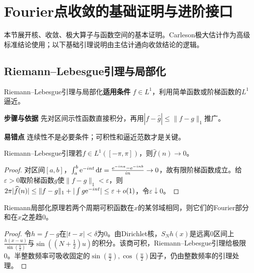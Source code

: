\section{Fourier点收敛的基础证明与进阶接口}\label{deep:fourier_source_deep}

\begin{examtip}本节展开核、收敛、极大算子与函数空间的基本证明。Carleson极大估计作为高级标准结论使用；以下基础引理说明由主估计通向收敛结论的逻辑。\end{examtip}

\subsection{Riemann--Lebesgue引理与局部化}\label{deep:fourier_source_deep:riemann}

\begin{method}{Riemann--Lebesgue引理与局部化}\textbf{适用条件} $f\in L^1$，利用简单函数或阶梯函数的$L^1$逼近。\par\textbf{步骤与依据} 先对区间示性函数直接积分，再用$|\widehat f-\widehat g|\le\|f-g\|_1$推广。\par\textbf{易错点} 连续性不是必要条件；可积性和逼近范数才是关键。\end{method}

\begin{theorem}{Riemann--Lebesgue引理}若$f\in L^1([-\pi,\pi])$，则$\widehat f(n)\to0$。\end{theorem}\begin{proof}对区间$[a,b]$，$\int_a^b\mathrm{e}^{-int}\mathop{}\!\mathrm{d} t=\frac{\mathrm{e}^{-ina}-\mathrm{e}^{-inb}}{in}\to0$，故有限阶梯函数成立。给$\varepsilon>0$取阶梯函数$g$使$\|f-g\|_1<\varepsilon$，则$2\pi|\widehat f(n)|\le\|f-g\|_1+|\int g\mathrm{e}^{-int}|\le\varepsilon+o(1)$，令$\varepsilon\downarrow0$。\end{proof}

\begin{theorem}{Riemann局部化原理}若两个周期可积函数在$x$的某邻域相同，则它们的Fourier部分和在$x$之差趋0。\end{theorem}\begin{proof}令$h=f-g$在$|t-x|<\delta$为0。由Dirichlet核，$S_Nh(x)$是远离0区间上$\frac{h(x-u)}{\sin(\frac{u}{2})}$与$\sin((N+\frac{1}{2})u)$的积分。该商可积，Riemann--Lebesgue引理给极限0。半整数频率可吸收固定的$\sin(\frac{u}{2}),\cos(\frac{u}{2})$因子，仍由整数频率的引理处理。\end{proof}

